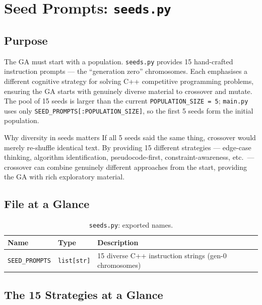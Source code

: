 \documentclass[11pt,a4paper]{report}
\newcommand{\pyfile}[1]{\texttt{#1}}
\newcommand{\fn}[1]{\texttt{#1}}
\begin{document}
\chapter{Seed Prompts: \pyfile{seeds.py}}

\section{Purpose}

The GA must start with a population.  \pyfile{seeds.py} provides 15 hand-crafted
instruction prompts --- the ``generation zero'' chromosomes.  Each emphasises a
different cognitive strategy for solving C++ competitive programming problems, ensuring
the GA starts with genuinely diverse material to crossover and mutate.  The pool of 15
seeds is larger than the current \fn{POPULATION\_SIZE = 5}; \fn{main.py} uses only
\fn{SEED\_PROMPTS[:POPULATION\_SIZE]}, so the first 5 seeds form the initial population.

\begin{conceptbox}{Why diversity in seeds matters}
If all 5 seeds said the same thing, crossover would merely re-shuffle identical text.
By providing 15 different strategies --- edge-case thinking, algorithm identification,
pseudocode-first, constraint-awareness, etc.\ --- crossover can combine genuinely
different approaches from the start, providing the GA with rich exploratory material.
\end{conceptbox}

\section{File at a Glance}

\begin{table}[h]
\centering
\begin{tabular}{@{}llp{8cm}@{}}
\toprule
\textbf{Name} & \textbf{Type} & \textbf{Description} \\
\midrule
\fn{SEED\_PROMPTS} & \texttt{list[str]} & 15 diverse C++ instruction strings (gen-0 chromosomes) \\
\bottomrule
\end{tabular}
\caption{\pyfile{seeds.py}: exported names.}
\end{table}

\section{The 15 Strategies at a Glance}
\end{document}
